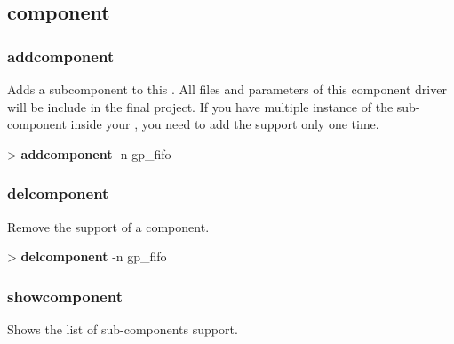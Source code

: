 \documentclass[10pt,a4paper]{article}
\begin{document}
\subsection{component}
\subsubsection{addcomponent}
\label{subsec:addcomponent}

Adds a subcomponent to this \kind{}. All files and parameters of this component driver will be include in the final project. If you have multiple instance of the sub-component inside your \kind{}, you need to add the support only one time.\\


\begin{sampletitle}
> \textbf{\tool{} addcomponent} -n gp\_fifo
\end{sampletitle}

\subsubsection{delcomponent}
\label{subsec:delcomponent}

Remove the support of a component. \\


\begin{sampletitle}
> \textbf{\tool{} delcomponent} -n gp\_fifo
\end{sampletitle}

\subsubsection{showcomponent}
\label{subsec:showcomponent}

Shows the list of sub-components support. \\
\end{document}

